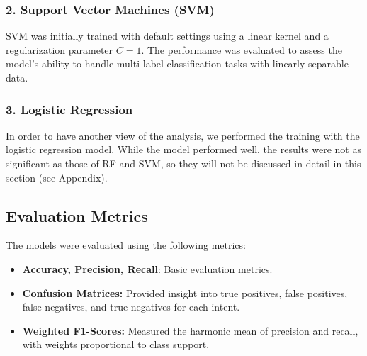         \subsubsection*{2. Support Vector Machines (SVM) \\}
        
        
            SVM was initially trained with default settings using a linear kernel and a regularization parameter \( C = 1 \). The performance was evaluated to assess the model's ability to handle multi-label classification tasks with linearly separable data.

        \subsubsection*{3. Logistic Regression \\}
        
        
            In order to have another view of the analysis, we performed the training with the logistic regression model. While the model performed well, the results were not as significant as those of RF and SVM, so they will not be discussed in detail in this section (see Appendix).

    \subsection{Evaluation Metrics}
    
        The models were evaluated using the following metrics:
        
        \begin{itemize}
        
            \item \textbf{Accuracy, Precision, Recall}: Basic evaluation metrics.
            
            \item \textbf{Confusion Matrices:} Provided insight into true positives, false positives, false negatives, and true negatives for each intent.
            
            \item \textbf{Weighted F1-Scores:} Measured the harmonic mean of precision and recall, with weights proportional to class support.
        
        \end{itemize}

